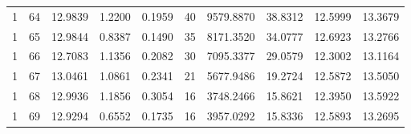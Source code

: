 \begin{longtable}{rrrrrrrrrr}
1 & 64 & 12.9839 & 1.2200 & 0.1959 & 40 & 9579.8870 & 38.8312 & 12.5999 & 13.3679 \\
1 & 65 & 12.9844 & 0.8387 & 0.1490 & 35 & 8171.3520 & 34.0777 & 12.6923 & 13.2766 \\
1 & 66 & 12.7083 & 1.1356 & 0.2082 & 30 & 7095.3377 & 29.0579 & 12.3002 & 13.1164 \\
1 & 67 & 13.0461 & 1.0861 & 0.2341 & 21 & 5677.9486 & 19.2724 & 12.5872 & 13.5050 \\
1 & 68 & 12.9936 & 1.1856 & 0.3054 & 16 & 3748.2466 & 15.8621 & 12.3950 & 13.5922 \\
1 & 69 & 12.9294 & 0.6552 & 0.1735 & 16 & 3957.0292 & 15.8336 & 12.5893 & 13.2695 \\
\end{longtable}
